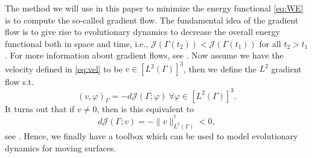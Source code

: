 The method we will use in this paper to minimize the energy functional \eqref{eq:WE} is to compute the so-called gradient flow. The fundamental idea of the gradient flow is to give rise to evolutionary dynamics to decrease the overall energy
functional both in space and time, i.e., $\mathcal{J}\left( \Gamma \left( t_{2} \right)  \right) <   \mathcal{J}\left( \Gamma \left( t_{1} \right)\right)$ for all  $t_{2} > t_{1}$. For more information about gradient flows, see
    \cite{dogan2007discrete, dogan2005finite}. Now assume we have the velocity defined in \eqref{eq:vel} to be $v \in \left[ L^{2}\left( \Gamma  \right)  \right]^3 $, then we define the $L^2$  gradient flow s.t. \[
      \left( v,\varphi  \right) _{\Gamma  }  = - d \mathcal{J} \left( \Gamma ; \varphi  \right) \  \forall \varphi \in \left[ L^2\left( \Gamma  \right)   \right] ^3.
    \]
    It turns out that if $v \neq 0$, then is this equivalent to
    \begin{equation}
    \label{eq:gradient_flow}
d \mathcal{J} \left( \Gamma ; v \right) = -\| v \|_{ L^2\left( \Gamma  \right)  }^{^2  } < 0,
    \end{equation}
see \cite{ito2008variational}.
Hence, we finally have a toolbox which can be used to model evolutionary dynamics for moving surfaces.











